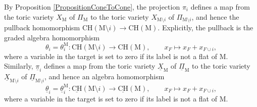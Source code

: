 \documentclass[11pt,reqno]{amsart}
\theoremstyle{definition}
\theoremstyle{remark}
\renewcommand{\(}{\left(}
\renewcommand{\)}{\right)}
\newcommand{\<}{\left<}
\renewcommand{\>}{\right>}
\begin{document}
By Proposition \ref{PropositionConeToCone},
the projection $\pi_i$ defines a map from the toric variety $X_\mathrm{M}$ of $\Pi_{\mathrm{M}}$ to the toric variety $X_{\mathrm{M} \setminus i}$ of $\Pi_{ {\mathrm{M} \setminus i}}$,
and hence the pullback homomorphism $ \mathrm{CH}(\mathrm{M}\setminus i)  \to \mathrm{CH}(\mathrm{M})$.
Explicitly, the pullback is the graded algebra homomorphism
\[
\theta_i=\theta^\mathrm{M}_i : \mathrm{CH}(\mathrm{M}\setminus i) \longrightarrow \mathrm{CH}(\mathrm{M}), \qquad x_F\longmapsto x_F + x_{F\cup i},
\]
where a variable in the target is set to zero if its label is not a flat of $\mathrm{M}$.
Similarly,  $\underline{\pi}_i$ defines a map from the toric variety $\underline{X}_\mathrm{M}$ of $\underline{\Pi}_{\mathrm{M}}$ to the toric variety $\underline{X}_{\mathrm{M} \setminus i}$ of $\underline{\Pi}_{ {\mathrm{M} \setminus i}}$,
and hence an algebra homomorphism
\[
\underline{\theta}_i =\underline{\theta}^\mathrm{M}_i : \underline{\mathrm{CH}}(\mathrm{M}\setminus i) \longrightarrow \underline{\mathrm{CH}}(\mathrm{M}), \qquad x_F\longmapsto x_F + x_{F\cup i},
\]
where a variable in the target is set to zero if its label is not a flat of $\mathrm{M}$.
\end{document}
